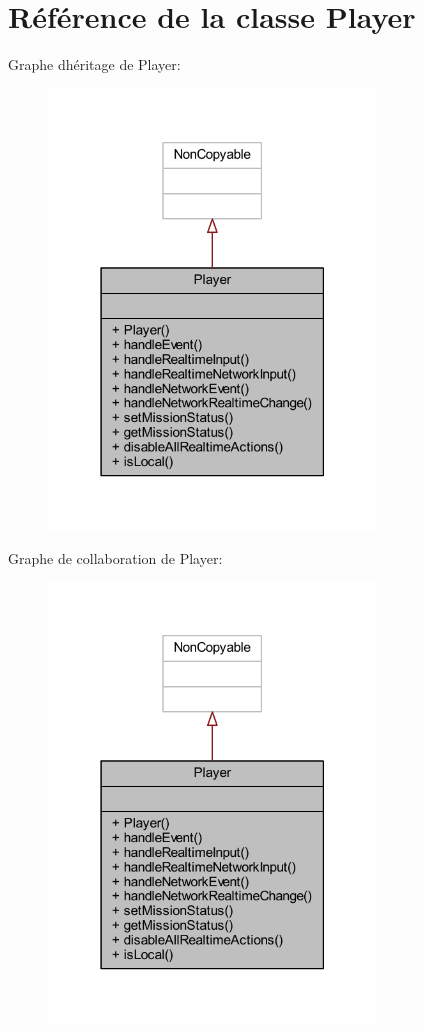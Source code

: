 \hypertarget{class_player}{}\section{Référence de la classe Player}
\label{class_player}


Graphe d\textquotesingle{}héritage de Player\+:\nopagebreak
\begin{figure}[H]
\begin{center}
\leavevmode
\includegraphics[width=247pt]{class_player__inherit__graph}
\end{center}
\end{figure}


Graphe de collaboration de Player\+:\nopagebreak
\begin{figure}[H]
\begin{center}
\leavevmode
\includegraphics[width=247pt]{class_player__coll__graph}
\end{center}
\end{figure}
